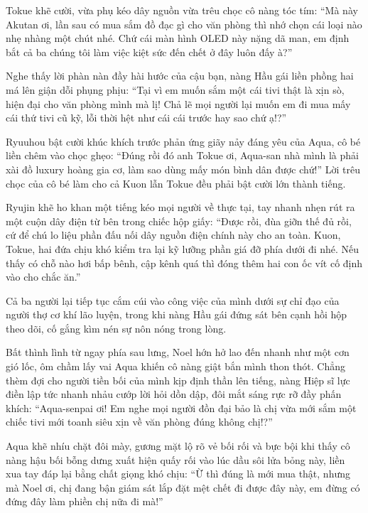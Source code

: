 \documentclass[../main.tex]{subfiles}
\begin{document}
Tokue khẽ cười, vừa phụ kéo dây nguồn vừa trêu chọc cô nàng tóc tím: ``Mà này Akutan ơi, lần sau có mua sắm đồ đạc gì cho văn phòng thì nhớ chọn cái loại nào nhẹ nhàng một chút nhé. Chứ cái màn hình OLED này nặng dã man, em định bắt cả ba chúng tôi làm việc kiệt sức đến chết ở đây luôn đấy à?''

Nghe thấy lời phàn nàn đầy hài hước của cậu bạn, nàng Hầu gái liền phồng hai má lên giận dỗi phụng phịu: ``Tại vì em muốn sắm một cái tivi thật là xịn sò, hiện đại cho văn phòng mình mà lị! Chả lẽ mọi người lại muốn em đi mua mấy cái thứ tivi cũ kỹ, lỗi thời hệt như cái cái trước hay sao chứ ạ!?''

Ryuuhou bật cười khúc khích trước phản ứng giãy nảy đáng yêu của Aqua, cô bé liền chêm vào chọc ghẹo: ``Đúng rồi đó anh Tokue ơi, Aqua-san nhà mình là phải xài đồ luxury hoàng gia cơ, làm sao dùng mấy món bình dân được chứ!'' Lời trêu chọc của cô bé làm cho cả Kuon lẫn Tokue đều phải bật cười lớn thành tiếng.

Ryujin khẽ ho khan một tiếng kéo mọi người về thực tại, tay nhanh nhẹn rút ra một cuộn dây điện từ bên trong chiếc hộp giấy: ``Được rồi, đùa giỡn thế đủ rồi, cứ để chú lo liệu phần đấu nối dây nguồn điện chính này cho an toàn. Kuon, Tokue, hai đứa chịu khó kiểm tra lại kỹ lưỡng phần giá đỡ phía dưới đi nhé. Nếu thấy có chỗ nào hơi bấp bênh, cập kênh quá thì đóng thêm hai con ốc vít cố định vào cho chắc ăn.''

Cả ba người lại tiếp tục cắm cúi vào công việc của mình dưới sự chỉ đạo của người thợ cơ khí lão luyện, trong khi nàng Hầu gái đứng sát bên cạnh hồi hộp theo dõi, cố gắng kìm nén sự nôn nóng trong lòng.

Bất thình lình từ ngay phía sau lưng, Noel hớn hở lao đến nhanh như một cơn gió lốc, ôm chầm lấy vai Aqua khiến cô nàng giật bắn mình thon thót. Chẳng thèm đợi cho người tiền bối của mình kịp định thần lên tiếng, nàng Hiệp sĩ lực điền lập tức nhanh nhảu cướp lời hỏi dồn dập, đôi mắt sáng rực rỡ đầy phấn khích: ``Aqua-senpai ơi! Em nghe mọi người đồn đại bảo là chị vừa mới sắm một chiếc tivi mới toanh siêu xịn về văn phòng đúng không chị!?''


Aqua khẽ nhíu chặt đôi mày, gương mặt lộ rõ vẻ bối rối và bực bội khi thấy cô nàng hậu bối bỗng dưng xuất hiện quấy rối vào lúc dầu sôi lửa bỏng này, liền xua tay đáp lại bằng chất giọng khó chịu: ``Ừ thì đúng là mới mua thật, nhưng mà Noel ơi, chị đang bận giám sát lắp đặt mệt chết đi được đây này, em đừng có đứng đây làm phiền chị nữa đi mà!''
\end{document}
